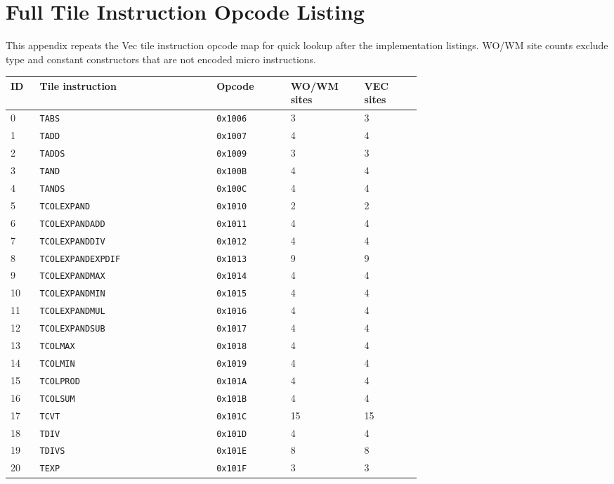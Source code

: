 \chapter{Full Tile Instruction Opcode Listing}
This appendix repeats the Vec tile instruction opcode map for quick lookup after the implementation listings. WO/WM site counts exclude type and constant constructors that are not encoded micro instructions.
{\scriptsize
\begin{longtable}{@{}R{0.045\linewidth}L{0.31\linewidth}L{0.13\linewidth}R{0.10\linewidth}R{0.10\linewidth}@{}}
\toprule
ID & Tile instruction & Opcode & WO/WM sites & VEC sites \\
 & \texttt{TABS} & \texttt{0x1006} & 3 & 3 \\
1 & \texttt{TADD} & \texttt{0x1007} & 4 & 4 \\
2 & \texttt{TADDS} & \texttt{0x1009} & 3 & 3 \\
3 & \texttt{TAND} & \texttt{0x100B} & 4 & 4 \\
4 & \texttt{TANDS} & \texttt{0x100C} & 4 & 4 \\
5 & \texttt{TCOLEXPAND} & \texttt{0x1010} & 2 & 2 \\
6 & \texttt{TCOLEXPANDADD} & \texttt{0x1011} & 4 & 4 \\
7 & \texttt{TCOLEXPANDDIV} & \texttt{0x1012} & 4 & 4 \\
8 & \texttt{TCOLEXPANDEXPDIF} & \texttt{0x1013} & 9 & 9 \\
9 & \texttt{TCOLEXPANDMAX} & \texttt{0x1014} & 4 & 4 \\
10 & \texttt{TCOLEXPANDMIN} & \texttt{0x1015} & 4 & 4 \\
11 & \texttt{TCOLEXPANDMUL} & \texttt{0x1016} & 4 & 4 \\
12 & \texttt{TCOLEXPANDSUB} & \texttt{0x1017} & 4 & 4 \\
13 & \texttt{TCOLMAX} & \texttt{0x1018} & 4 & 4 \\
14 & \texttt{TCOLMIN} & \texttt{0x1019} & 4 & 4 \\
15 & \texttt{TCOLPROD} & \texttt{0x101A} & 4 & 4 \\
16 & \texttt{TCOLSUM} & \texttt{0x101B} & 4 & 4 \\
17 & \texttt{TCVT} & \texttt{0x101C} & 15 & 15 \\
18 & \texttt{TDIV} & \texttt{0x101D} & 4 & 4 \\
19 & \texttt{TDIVS} & \texttt{0x101E} & 8 & 8 \\
20 & \texttt{TEXP} & \texttt{0x101F} & 3 & 3 \\

\end{longtable}}
